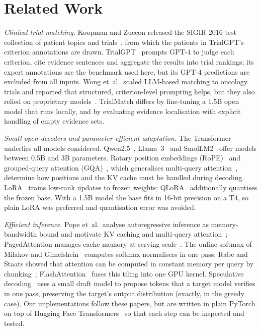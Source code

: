 \documentclass[conference]{IEEEtran}
\begin{document}
\section{Related Work}
\textit{Clinical trial matching.} Koopman and Zuccon released the SIGIR 2016 test collection of patient topics and trials~\cite{koopman2016}, from which the patients in TrialGPT's criterion annotations are drawn. TrialGPT~\cite{jin2024trialgpt} prompts GPT-4 to judge each criterion, cite evidence sentences and aggregate the results into trial rankings; its expert annotations are the benchmark used here, but its GPT-4 predictions are excluded from all inputs. Wong et~al.\ scaled LLM-based matching to oncology trials and reported that structured, criterion-level prompting helps, but they also relied on proprietary models~\cite{wong2023scaling}. TrialMatch differs by fine-tuning a 1.5B open model that runs locally, and by evaluating evidence localisation with explicit handling of empty evidence sets.

\textit{Small open decoders and parameter-efficient adaptation.} The Transformer~\cite{vaswani2017} underlies all models considered. Qwen2.5~\cite{qwen25}, Llama~3~\cite{llama3} and SmolLM2~\cite{smollm2} offer models between 0.5B and 3B parameters. Rotary position embeddings (RoPE)~\cite{su2024roformer} and grouped-query attention (GQA)~\cite{ainslie2023gqa}, which generalises multi-query attention~\cite{shazeer2019}, determine how positions and the KV cache must be handled during decoding. LoRA~\cite{hu2022lora} trains low-rank updates to frozen weights; QLoRA~\cite{dettmers2023qlora} additionally quantises the frozen base. With a 1.5B model the base fits in 16-bit precision on a T4, so plain LoRA was preferred and quantisation error was avoided.

\textit{Efficient inference.} Pope et~al.\ analyse autoregressive inference as memory-bandwidth bound and motivate KV caching and multi-query attention~\cite{pope2023}; PagedAttention manages cache memory at serving scale~\cite{kwon2023paged}. The online softmax of Milakov and Gimelshein~\cite{milakov2018} computes softmax normalisers in one pass; Rabe and Staats showed that attention can be computed in constant memory per query by chunking~\cite{rabe2021}; FlashAttention~\cite{dao2022flash,dao2023flash2} fuses this tiling into one GPU kernel. Speculative decoding~\cite{leviathan2023,chen2023spec} uses a small draft model to propose tokens that a target model verifies in one pass, preserving the target's output distribution (exactly, in the greedy case). Our implementations follow these papers, but are written in plain PyTorch on top of Hugging Face Transformers~\cite{wolf2020transformers} so that each step can be inspected and tested.
\end{document}

